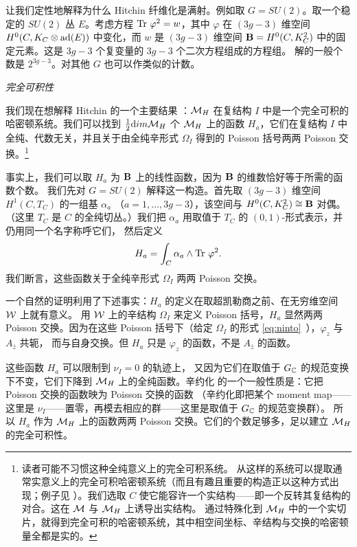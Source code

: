 让我们定性地解释为什么 Hitchin 纤维化是满射。例如取 $G=SU(2)$。取一个稳定的 $SU(2)$
丛 $E$。考虑方程 $\Tr\,\varphi^2=w$，其中
$\varphi $ 在 $(3g-3)$ 维空间
$H^0(C,K_C\otimes \ad(E))$ 中变化，而 $w$ 是
$(3g-3)$ 维空间 ${\EUBB}=H^0(C,K_C^2)$ 中的固定元素。这是
$3g-3$ 个复变量的 $3g-3$ 个二次方程组成的方程组。
解的一般个数是 $2^{3g-3}$。对其他 $G$ 也可以作类似的计数。

\par\medskip\emph{完全可积性}

\cite{ref62}

 我们现在想解释 Hitchin 的一个主要结果 ：$\MH$ 在复结构 $I$ 中是一个完全可积的哈密顿系统。我们可以找到 ${1\over 2}{\rm
dim}\MH$ 个 $\MH$ 上的函数 $H_a$，它们在复结构
$I$ 中全纯、代数无关，并且关于由全纯辛形式 $\Omega_I$ 得到的 Poisson 括号两两
Poisson 交换。\footnote{读者可能不习惯这种全纯意义上的完全可积系统。
从这样的系统可以提取通常实意义上的完全可积哈密顿系统（而且有趣且重要的构造正以这种方式出现；例子见
\cite{ref63,ref64}）。我们选取 $C$ 使它能容许一个实结构——即一个反转其复结构的对合。这在 $\M$ 与 $\MH$ 上诱导出实结构。
通过特殊化到 $\MH$ 中的一个实切片，就得到完全可积的哈密顿系统，其中相空间坐标、辛结构与交换的哈密顿量全都是实的。}

事实上，我们可以取 $H_a$ 为 ${\EUBB}$ 上的线性函数，因为 ${\EUBB}$ 的维数恰好等于所需的函数个数。
我们先对 $G=SU(2)$ 解释这一构造。首先取 $(3g-3)$ 维空间 $ H^1(C,T_C)$ 的一组基 $\alpha_a$
（$a=1,\dots,3g-3$），该空间与 $H^0(C, K_C^2)\cong {\EUBB}$ 对偶。（这里 $T_C$ 是
$C$ 的全纯切丛。）我们把 $\alpha_a$ 用取值于 $T_C$ 的 $(0,1)$-形式表示，并仍用同一个名字称呼它们，
然后定义 %
\setcounter{equation}{25}
\begin{equation}\label{eq:miro}
H_a=\int_C\alpha_a \wedge \Tr\,\varphi^2.
\end{equation}
 我们断言，这些函数关于全纯辛形式 $\Omega_I$ 两两 Poisson 交换。

一个自然的证明利用了下述事实：$H_a$ 的定义在取超凯勒商之前、在无穷维空间 $\EUW$ 上就有意义。
用 $\EUW$ 上的辛结构 $\Omega_I$ 来定义 Poisson 括号，$H_a$ 显然两两 Poisson 交换。因为在这些 Poisson 括号下（给定 $\Omega_I$ 的形式 \eqref{eq:ninto}\ ），$\varphi_z$ 与 $A_{\bar z}$ 共轭，
而与自身交换。但 $H_a$ 只是 $\varphi_z$ 的函数，不是 $A_{\bar z}$ 的函数。

这些函数 $H_a$ 可以限制到 $\nu_I=0$ 的轨迹上，
又因为它们在取值于 $G_{\Bbb{C}}$ 的规范变换下不变，它们下降到 $\MH$ 上的全纯函数。辛约化
的一个一般性质是：它把 Poisson 交换的函数映为 Poisson 交换的函数
（辛约化即把某个 moment map——这里是 $\nu_I$——置零，再模去相应的群——这里是取值于 $G_{\Bbb{C}}$ 的规范变换群）。
所以 $H_a$ 作为 $\MH$ 上的函数两两 Poisson 交换。它们的个数足够多，足以建立 $\MH$ 的完全可积性。

